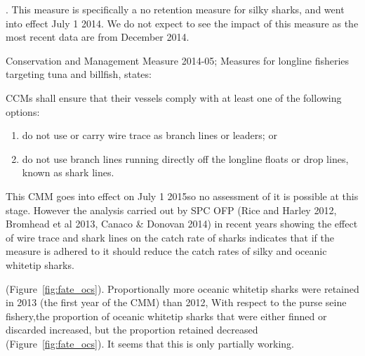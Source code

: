 \documentclass[12pt]{SCreport}
\begin{document}
\begin{description}
 
\item[CMM 2013-08 : Conservation and Management Measure for Silky Shark]. This measure is specifically a no retention measure for silky sharks, and went into effect July 1 2014. We do not expect to see the impact of this measure as the most recent data are from December 2014. 

\item  Conservation and Management Measure 2014-05; Measures for longline fisheries targeting tuna and billfish,  states: 

      CCMs shall ensure that their vessels comply with at least one of the following options:
        \begin{enumerate}
            \item  do not use or carry wire trace as branch lines or leaders; or
              \item  do not use branch lines running directly off the longline floats or drop lines, known as shark lines. 
           \end{enumerate}
This CMM goes into effect on July 1 2015so no assessment of it is possible at this stage. However the analysis carried out by SPC OFP (Rice and Harley 2012, Bromhead et al 2013, Canaco & Donovan 2014) in recent years showing the effect of wire trace and shark lines on the catch rate of sharks indicates that if the measure is adhered to it should reduce the catch rates of silky and oceanic whitetip sharks.

 \end{description}
(Figure~\ref{fig:fate_ocs}).  
Proportionally  more oceanic whitetip sharks were retained in 2013 (the first year of the CMM) than 2012,   With respect to the purse seine fishery,the proportion of oceanic whitetip sharks that were either finned or discarded increased, but the proportion retained decreased (Figure~\ref{fig:fate_ocs}).  It seems that this is only partially working.
\end{document}
